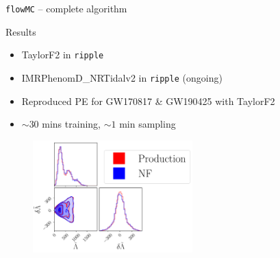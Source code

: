   
  
  \begin{frame}{\texttt{flowMC} -- complete algorithm}
  
  
    \vspace{-5mm}  
    
  
  
  \end{frame}
  
  
  
  \begin{frame}{Results}
    \def\x{2mm}
    \def\y{-3mm}
  
  
    \begin{itemize}
      \item TaylorF2 in \texttt{ripple}
      
      \vspace{\x}
  
      \item IMRPhenomD\_NRTidalv2 in \texttt{ripple} (ongoing)
      
      \vspace{\x}
      
      \item Reproduced PE for GW170817 \& GW190425 with TaylorF2
      
      \vspace{\x}
  
      \item $\sim 30$ mins training, $\sim 1$ min sampling
    \end{itemize}
  
    \vspace{\y}
  
    \vspace{8mm}
    \begin{figure}[H]
      \centering
      \includegraphics[width = 0.55\textwidth]{Figures/presentation_GW170817_production_vs_NF.pdf}
    \end{figure}
  \end{frame}
  

